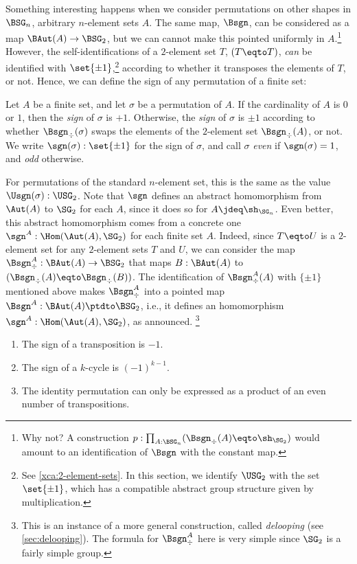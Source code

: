 Something interesting happens when we consider
permutations on other shapes in $\BSG_n$,
\ie arbitrary $n$-element sets $A$.
The same map, $\Bsgn$, can be considered as a map $\BAut(A) \to \BSG_2$,
but we can cannot make this pointed uniformly in $A$.\footnote{%
  Why not? A construction $p : \prod_{A:\BSG_n}(\Bsgn_\div(A) \eqto \sh_{\SG_2})$
  would amount to an identification of $\Bsgn$ with the constant map.}
However, the self-identifications of a $2$-element set $T$, $(T \eqto T)$,
\emph{can} be identified with $\set{\pm1}$,\footnote{%
  See \cref{xca:2-element-sets}.
  In this section, we identify $\USG_2$ with the set $\set{\pm1}$,
  which has a compatible abstract group structure given by multiplication.}
according to whether it transposes the elements of $T$, or not.
Hence, we can define the sign of any permutation of a finite set:
\begin{definition}\label{def:sgn-permutation}
  Let $A$ be a finite set, and let $\sigma$ be a permutation of $A$.
  If the cardinality of $A$ is $0$ or $1$,
  then the \emph{sign} of $\sigma$ is $+1$.
  Otherwise, the \emph{sign} of $\sigma$ is $\pm1$ according to whether
  $\Bsgn_\div(\sigma)$ swaps the elements of the $2$-element 
  set $\Bsgn_\div(A)$, or not.
  We write $\sgn(\sigma):\set{\pm1}$ for the sign of $\sigma$,
  and call $\sigma$ \emph{even} if $\sgn(\sigma)=1$,
  and \emph{odd} otherwise.
\end{definition}
For permutations of the standard $n$-element set, this is the same as the value
$\Usgn(\sigma) : \USG_2$. Note that $\sgn$ defines an abstract homomorphism from
$\Aut(A)$ to $\SG_2$ for each $A$, since it does so for $A \jdeq
\sh_{\SG_n}$. Even better, this abstract homomorphism comes from a concrete one
$\sgn^A : \Hom(\Aut(A),\SG_2)$ for each finite set $A$. Indeed, since
$T \eqto U$ is a $2$-element set for any $2$-element sets $T$ and $U$, we can
consider the map $\Bsgn^A_\div : \BAut(A) \to \BSG_2$ that maps
$B : \BAut(A)$ to $(\Bsgn_\div(A) \eqto \Bsgn_\div(B))$. The identification of
$\Bsgn^A_\div(A)$ with $\{\pm1\}$ mentioned above makes $\Bsgn^A_\div$ into a
pointed map $\Bsgn^A : \BAut(A) \ptdto \BSG_2$, i.e., it defines an homomorphism
$\sgn^A : \Hom(\Aut(A),\SG_2)$, as announced.%
\footnote{This is an instance of a more general construction, called {\em
    delooping} (see \cref{sec:delooping}). The formula for $\Bsgn^A_\div$ here is
  very simple since $\SG_2$ is a fairly simple group.} %

\begin{lemma}\label{lem:sign-properties}
  \begin{enumerate}
  \item\label{it:sign-transposition}
    The sign of a transposition is $-1$.
  \item\label{it:sign-cycle}
    The sign of a $k$-cycle is $(-1)^{k-1}$.
  \item\label{it:identity-even}
    The identity permutation can only be expressed as a product
    of an even number of transpositions.
  \end{enumerate}
\end{lemma}

